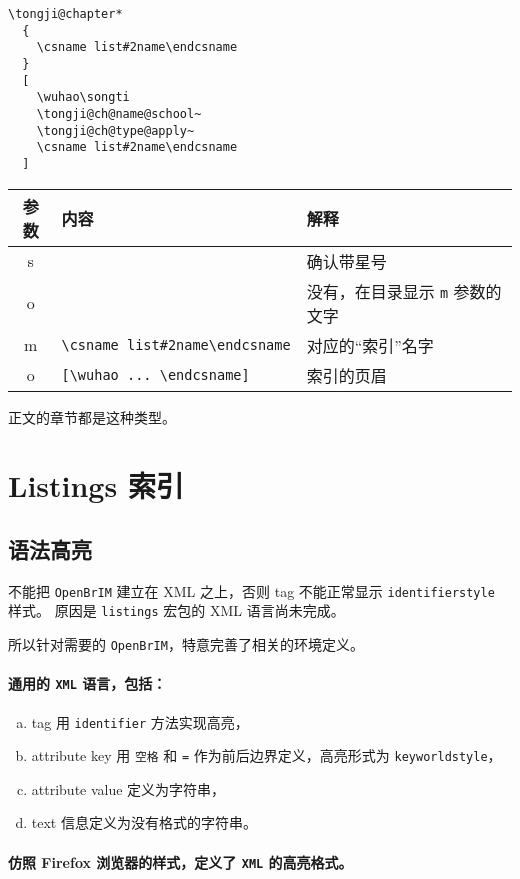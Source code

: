 \documentclass[../Main/thesis.tex]{subfiles}
\begin{document}
\begin{enumerate}
\begin{lstlisting}[language={TongjiLaTeX}, style=colorEX]
\tongji@chapter*
  {
    \csname list#2name\endcsname
  }
  [
    \wuhao\songti
    \tongji@ch@name@school~
    \tongji@ch@type@apply~
    \csname list#2name\endcsname
  ]
\end{lstlisting}

  \begin{longtable}[]{@{}cll@{}}
  \toprule
  参数 & 内容 & 解释\tabularnewline
  \midrule
  \endhead
  s & & 确认带星号\tabularnewline
  o & & 没有，在目录显示 \texttt{m} 参数的文字\tabularnewline
  m &
  \texttt{\textbackslash{}csname\ list\#2name\textbackslash{}endcsname}
  & 对应的“索引”名字\tabularnewline
  o &
  \texttt{[\textbackslash{}wuhao\ ...\ \textbackslash{}endcsname]} &
  索引的页眉\tabularnewline
  \bottomrule
  \end{longtable}

  正文的章节都是这种类型。
\end{enumerate}

\section{Listings 索引}

\subsection{语法高亮}

不能把 \texttt{OpenBrIM} 建立在 XML 之上，否则 tag 不能正常显示 \texttt{identifierstyle} 样式。
原因是 \texttt{listings} 宏包的 XML 语言尚未完成。

所以针对需要的 \texttt{OpenBrIM}，特意完善了相关的环境定义。

\paragraph{通用的 \texttt{XML} 语言，包括：}
\begin{enumerate}[(a)]
  \item tag 用 \texttt{identifier} 方法实现高亮，
  \item attribute key 用 \texttt{空格} 和 \texttt{=} 作为前后边界定义，高亮形式为 \texttt{keyworldstyle}，
  \item attribute value 定义为字符串，
  \item text 信息定义为没有格式的字符串。
\end{enumerate}

\paragraph{仿照 Firefox 浏览器的样式，定义了 \texttt{XML} 的高亮格式。}
\end{document}
